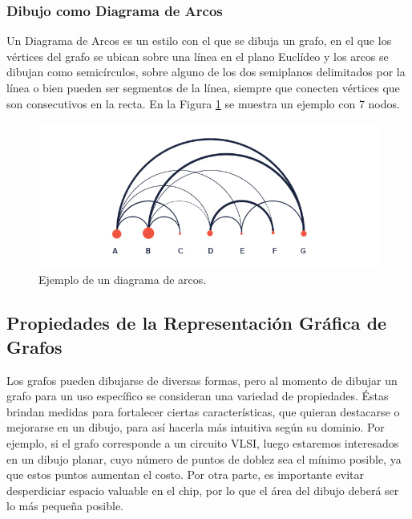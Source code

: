 \subsubsection{Dibujo como Diagrama de Arcos}
\label{sec:dibujado_diagrama_de_arcos}

Un Diagrama de Arcos \cite{Wat02} es un estilo con el  que se dibuja un grafo, en el que los vértices del grafo se ubican sobre  una línea en el plano  Euclídeo y los arcos se dibujan como  semicírculos, sobre alguno de los dos  semiplanos delimitados por la línea o bien pueden ser segmentos de la línea, siempre que conecten vértices que son consecutivos en la recta.
En la Figura \ref{fig:arcdiagram_ejemplo} se muestra un ejemplo con 7 nodos.

\begin{figure}[h]
	\centering
	\includegraphics[width=12cm]{imagenes/diagrama-de-arco.jpg}
	\caption{Ejemplo de un diagrama de arcos.}
	\label{fig:arcdiagram_ejemplo}
\end{figure}


\subsection{Propiedades de la Representación Gráfica de Grafos}
\label{sec:propiedades_dibujado_grafos}
Los grafos pueden dibujarse de diversas formas, pero al momento de dibujar un grafo para un uso específico se consideran una variedad de propiedades. Éstas brindan medidas para fortalecer ciertas características, que quieran destacarse o mejorarse en  un dibujo, para así hacerla más intuitiva según su dominio. Por ejemplo, si el grafo corresponde a un circuito VLSI, luego estaremos interesados en un dibujo planar, cuyo número de puntos de doblez  sea el mínimo posible, ya que estos puntos aumentan el costo. Por otra parte, es importante evitar desperdiciar espacio valuable en el chip, por lo que  el área del dibujo deberá ser  lo más  pequeña posible.

